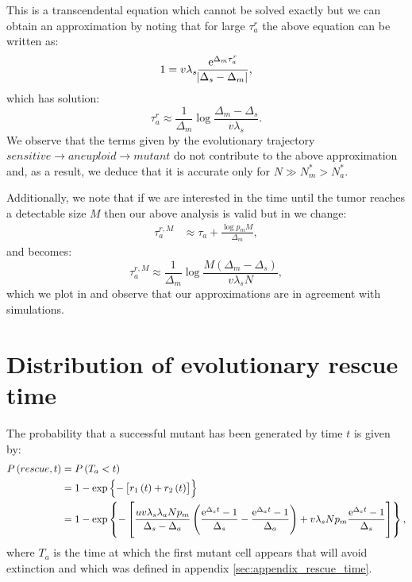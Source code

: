 \documentclass[12pt]{extarticle}
\newcommand{\e}{{\rm e}}
\begin{document}
\begin{appendices}
This is a transcendental equation which cannot be solved exactly but we can obtain an approximation by noting that for large $\tau_a^r$ the above equation can be written as: 
\begin{equation*}
1=v\lambda_s\frac{\e^{\Delta_m\tau_a^r}}{\abs{\Delta_s-\Delta_m}},
\end{equation*}
which has solution:
\begin{equation}\label{eq:t2det}
\tau_a^r\approx\frac{1}{\Delta_m}\log\frac{\Delta_m-\Delta_s}{v\lambda_s}.
\end{equation}
We observe that the terms given by the evolutionary trajectory $sensitive \rightarrow aneuploid \rightarrow mutant$ do not contribute to the above approximation and, as a result, we deduce that it is accurate only for $N\gg N_m^*>N_a^*$. %

Additionally, we note that if we are interested in the time until the tumor reaches a detectable size $M$ then our above analysis is valid but in  we change:
\begin{align}\label{meanproliferationtime2}
\tau_a^{r,M}&\approx\tau_a+\frac{\log p_mM}{\Delta_m},
\end{align}
and  becomes:
\begin{equation}\label{eq:t2det2}
\tau_a^{r,M}\approx\frac{1}{\Delta_m}\log\frac{M\left(\Delta_m-\Delta_s\right)}{v\lambda_sN},
\end{equation}
which we plot in  and observe that our approximations are in agreement with simulations.

\section{Distribution of evolutionary rescue time}\label{sec:appendix_distribution_time}
The probability that a successful mutant has been generated by time $t$ is given by:
\begin{align*}
P\left(rescue,t\right)&=P\left(T_a<t\right)\\
&=1-\exp\left\{-\left[r_1\left(t\right)+r_2\left(t\right)\right]\right\}\\
&=1-\exp\left\{-\left[\frac{uv\lambda_s\lambda_aNp_m}{\Delta_s-\Delta_a}\left(\frac{\e^{\Delta_st}-1}{\Delta_s}-\frac{\e^{\Delta_at}-1}{\Delta_a}\right)+ v\lambda_sNp_m\frac{\e^{\Delta_s t}-1}{\Delta_s}\right]\right\},
\end{align*}
where $T_a$ is the time at which the first mutant cell appears that will avoid extinction and which was defined in appendix \ref{sec:appendix_rescue_time}.


\end{appendices}
\end{document}
